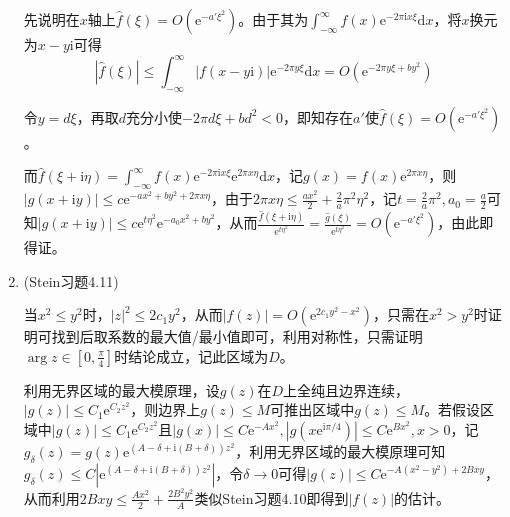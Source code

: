 \documentclass[a4paper,UTF8,fontset=windows]{ctexart}
\begin{document}
\begin{enumerate}
    先说明在$x$轴上$\hat{f}(\xi)=O(\mathrm{e}^{-a'\xi^2})$。由于其为$\int_{-\infty}^\infty f(x)\mathrm{e}^{-2\pi\mathrm{i}x\xi}\mathrm{d}x$，将$x$换元为$x-y\mathrm{i}$可得
    \[|\hat{f}(\xi)|\le\int_{-\infty}^\infty|f(x-y\mathrm{i})|\mathrm{e}^{-2\pi y\xi}\mathrm{d}x=O(\mathrm{e}^{-2\pi y\xi+by^2})\]
    
    令$y=d\xi$，再取$d$充分小使$-2\pi d\xi+bd^2<0$，即知存在$a'$使$\hat{f}(\xi)=O(\mathrm{e}^{-a'\xi^2})$。
    
    而$\hat{f}(\xi+\mathrm{i}\eta)=\int_{-\infty}^\infty f(x)\mathrm{e}^{-2\pi\mathrm{i}x\xi}\mathrm{e}^{2\pi x\eta}\mathrm{d}x$，记$g(x)=f(x)\mathrm{e}^{2\pi x\eta}$，则$|g(x+\mathrm{i}y)|\le c\mathrm{e}^{-ax^2+by^2+2\pi x\eta}$，由于$2\pi x\eta\le\frac{ax^2}{2}+\frac{2}{a}\pi^2\eta^2$，记$t=\frac{2}{a}\pi^2,a_0=\frac{a}{2}$可知$|g(x+\mathrm{i}y)|\le c\mathrm{e}^{t\eta^2}\mathrm{e}^{-a_0x^2+by^2}$，从而$\frac{\hat{f}(\xi+\mathrm{i}\eta)}{\mathrm{e}^{t\eta^2}}=\frac{\hat{g}(\xi)}{\mathrm{e}^{t\eta^2}}=O(\mathrm{e}^{-a'\xi^2})$，由此即得证。
    
    \item (Stein习题4.11)
    
    当$x^2\le y^2$时，$|z|^2\le2c_1y^2$，从而$|f(z)|=O(\mathrm{e}^{2c_1y^2-x^2})$，只需在$x^2>y^2$时证明可找到后取系数的最大值/最小值即可，利用对称性，只需证明$\arg z\in[0,\frac{\pi}{4}]$时结论成立，记此区域为$D$。
    
    利用无界区域的最大模原理，设$g(z)$在$D$上全纯且边界连续，$|g(z)|\le C_1\mathrm{e}^{C_2z^2}$，则边界上$g(z)\le M$可推出区域中$g(z)\le M$。若假设区域中$|g(z)|\le C_1\mathrm{e}^{C_2z^2}$且$|g(x)|\le C\mathrm{e}^{-Ax^2},|g(x\mathrm{e}^{\mathrm{i}\pi/4})|\le C\mathrm{e}^{Bx^2},x>0$，记$g_\delta(z)=g(z)\mathrm{e}^{(A-\delta+\mathrm{i}(B+\delta))z^2}$，利用无界区域的最大模原理可知$g_\delta(z)\le C|\mathrm{e}^{(A-\delta+\mathrm{i}(B+\delta))z^2}|$，令$\delta\to0$可得$|g(z)|\le C\mathrm{e}^{-A(x^2-y^2)+2Bxy}$，从而利用$2Bxy\le\frac{Ax^2}{2}+\frac{2B^2y^2}{A}$类似Stein习题4.10即得到$|f(z)|$的估计。
\end{enumerate}
\end{document}
